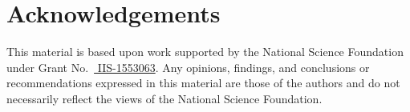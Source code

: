 \documentclass[letterpaper, 10 pt, conference]{ieeeconf}
\begin{document}














    
\section{Acknowledgements}
This material is based upon work supported by the National Science Foundation under Grant No.\ 
\href{http://nsf.gov/awardsearch/showAward?AWD_ID=1553063}{ IIS-1553063}.
Any opinions, findings, and conclusions or recommendations expressed in this material are those of the authors and do not necessarily reflect the views of the National Science Foundation.
   


\end{document}
